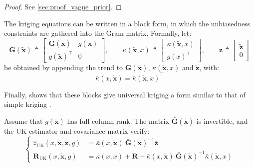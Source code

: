 \begin{proof}
	See \cref{sec:proof_vague_prior}.
\end{proof}

The kriging equations can be written in a block form, in which the unbiasedness constraints are gathered into the Gram matrix. Formally, let:
\begin{equation}
	\bar{\mathbf{G}}(\tilde{\mathbf{x}})\triangleq\begin{bmatrix}\mathbf{G}(\tilde{\mathbf{x}})&g(\tilde{\mathbf{x}})\\g(\tilde{\mathbf{x}})^\top&0\end{bmatrix},
	\qquad\bar{\kappa}(\tilde{\mathbf{x}},x)\triangleq\begin{bmatrix}\kappa(\tilde{\mathbf{x}},x)\\g(x)^\top\end{bmatrix},
	\qquad\bar{\mathbf{z}}\triangleq\begin{bmatrix}\tilde{\mathbf{z}}\\0\end{bmatrix}
\end{equation}
be obtained by appending the trend to $\mathbf{G}(\tilde{\mathbf{x}})$, $\kappa(\tilde{\mathbf{x}},x)$ and $\tilde{\mathbf{z}}$, with:
\begin{equation}
	\bar{\kappa}(x,\tilde{\mathbf{x}})=\bar{\kappa}(\tilde{\mathbf{x}},x)^\top
\end{equation}

Finally,  shows that these blocks give universal kriging a form similar to that of simple kriging \cite{bib:dual-kriging}.

\begin{proposition}\label{th:block_kriging}
	Assume that $g(\tilde{\mathbf{x}})$ has full column rank. The matrix $\bar{\mathbf{G}}(\tilde{\mathbf{x}})$ is invertible, and the UK estimator and covariance matrix verify:
	\begin{equation}
		\left\{\begin{aligned}
		\hat{z}_{\mathrm{UK}}(x,\tilde{\mathbf{x}},\tilde{\mathbf{z}},g)&=\bar{\kappa}(x,\tilde{\mathbf{x}})\:\bar{\mathbf{G}}(\tilde{\mathbf{x}})^{-1}\bar{\mathbf{z}}\\
		\mathbf{R}_{\mathrm{UK}}(x,\tilde{\mathbf{x}},g)&=\kappa(x,x)+\mathbf{R}-\bar{\kappa}(x,\tilde{\mathbf{x}})\:\bar{\mathbf{G}}(\tilde{\mathbf{x}})^{-1}\bar{\kappa}(\tilde{\mathbf{x}},x)
		\end{aligned}\right.
	\end{equation}
\end{proposition}

